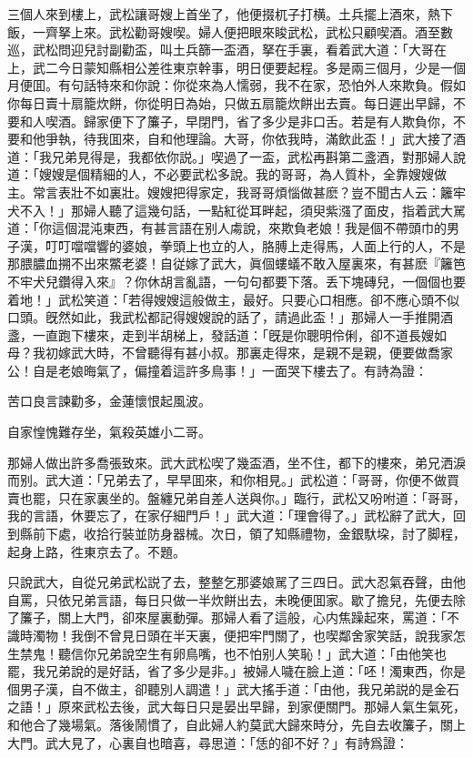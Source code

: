 三個人來到樓上，武松讓哥嫂上首坐了，他便掇杌子打横。土兵擺上酒來，熱下飯，一齊拏上來。武松勸哥嫂喫。婦人便把眼來睃武松，武松只顧喫酒。酒至數巡，武松問迎兒討副勸盃，叫土兵篩一盃酒，拏在手裏，看着武大道：「大哥在上，武二今日蒙知縣相公差徃東京幹事，明日便要起程。多是兩三個月，少是一個月便囬。有句話特來和你說：你從來為人懦弱，我不在家，恐怕外人來欺負。假如你每日賣十扇籠炊餅，你從明日為始，只做五扇籠炊餅出去賣。每日遲出早歸，不要和人喫酒。歸家便下了簾子，早閉門，省了多少是非口舌。若是有人欺負你，不要和他爭執，待我囬來，自和他理論。大哥，你依我時，滿飲此盃！」武大接了酒道：「我兄弟見得是，我都依你説。」喫過了一盃，武松再斟第二盞酒，對那婦人說道：「嫂嫂是個精細的人，不必要武松多說。我的哥哥，為人質朴，全靠嫂嫂做主。常言表壯不如裏壯。嫂嫂把得家定，我哥哥煩惱做甚麽？豈不聞古人云：籬牢犬不入！」那婦人聽了這幾句話，一點紅從耳畔起，須臾紫漒了面皮，指着武大駡道：「你這個混沌東西，有甚言語在别人䖏說，來欺負老娘！我是個不帶頭巾的男子漢，叮叮噹噹響的婆娘，拳頭上也立的人，胳膊上走得馬，人面上行的人，不是那腲膿血搠不出來鱉老婆！自従嫁了武大，眞個螻蟻不敢入屋裏來，有甚麽『籬笆不牢犬兒鑽得入來』？你休胡言亂語，一句句都要下落。丢下塊磚兒，一個個也要着地！」武松笑道：「若得嫂嫂這般做主，最好。只要心口相應。卻不應心頭不似口頭。旣然如此，我武松都記得嫂嫂說的話了，請過此盃！」那婦人一手推開酒盞，一直跑下樓來，走到半胡梯上，發話道：「旣是你聰明伶俐，卻不道長嫂如母？我初嫁武大時，不曾聽得有甚小叔。那裏走得來，是親不是親，便要做喬家公！自是老娘晦氣了，偏撞着這許多鳥事！」一面哭下樓去了。有詩為證：

\begin{myquote}
苦口良言諫勸多，金蓮懷恨起風波。

自家惶愧難存坐，氣殺英雄小二哥。
\end{myquote}

那婦人做出許多喬張致來。武大武松喫了幾盃酒，坐不住，都下的樓來，弟兄洒淚而别。武大道：「兄弟去了，早早囬來，和你相見。」武松道：「哥哥，你便不做買賣也罷，只在家裏坐的。盤纏兄弟自差人送與你。」臨行，武松又吩咐道：「哥哥，我的言語，休要忘了，在家仔細門戶！」武大道：「理會得了。」武松辭了武大，回到縣前下處，收拾行裝並防身器械。次日，領了知縣禮物，金銀馱垜，討了脚程，起身上路，徃東京去了。不題。

只說武大，自從兄弟武松説了去，整整乞那婆娘駡了三四日。武大忍氣吞聲，由他自罵，只依兄弟言語，每日只做一半炊餅出去，未晚便囬家。歇了擔兒，先便去除了簾子，關上大門，卻來屋裏動彈。那婦人看了這般，心内焦躁起來，罵道：「不識時濁物！我倒不曾見日頭在半天裏，便把牢門關了，也喫鄰舍家笑話，說我家怎生禁鬼！聽信你兄弟說空生有卵鳥嘴，也不怕别人笑恥！」武大道：「由他笑也罷，我兄弟說的是好話，省了多少是非。」被婦人噦在臉上道：「呸！濁東西，你是個男子漢，自不做主，卻聽別人調遣！」武大搖手道：「由他，我兄弟説的是金石之語！」原來武松去後，武大每日只是晏出早歸，到家便關門。那婦人氣生氣死，和他合了幾場氣。落後鬧慣了，自此婦人約莫武大歸來時分，先自去收簾子，關上大門。武大見了，心裏自也暗喜，尋思道：「恁的卻不好？」有詩爲證：

